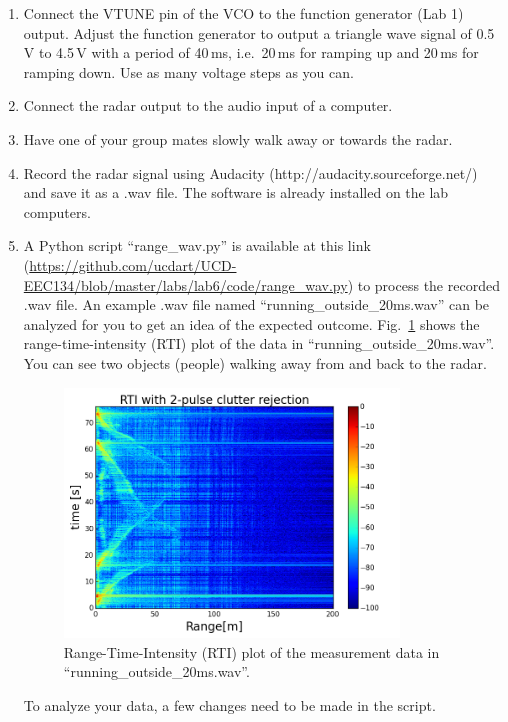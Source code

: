 \documentclass[letterpaper, 11pt]{article}
\begin{document}
\begin{enumerate}
	\item Connect the VTUNE pin of the VCO to the  function generator (Lab 1) output. Adjust the  function generator to output a triangle wave signal of 0.5\,V to 4.5\,V with a period of 40\,ms, i.e.~20\,ms for ramping up and 20\,ms for ramping down. Use as many voltage steps as you can. 
	
	\item Connect the radar output to the audio input of a computer. 
	
	\item Have one of your group mates slowly walk away or towards the radar. 
	
	\item Record the radar signal using Audacity (http://audacity.sourceforge.net/) and save it as a .wav file. The software is already installed on the lab computers.
	
	\item A Python script ``range\_wav.py'' is available at this link (\url{https://github.com/ucdart/UCD-EEC134/blob/master/labs/lab6/code/range_wav.py}) to process the recorded .wav file. An example .wav file named ``running\_outside\_20ms.wav'' can be analyzed for you to get an idea of the expected outcome. Fig.~\ref{fig:rti-cr} shows the range-time-intensity (RTI) plot of the data in ``running\_outside\_20ms.wav''. You can see two objects (people) walking away from and back to the radar. 
	
	\begin{figure}[h]
		\centering
		\includegraphics[width=3.5in]{rti-cr.png}
		\caption{Range-Time-Intensity (RTI) plot of the measurement data in ``running\_outside\_20ms.wav''.}
		\label{fig:rti-cr}
	\end{figure} 	
	
	
	To analyze your data, a few changes need to be made in the script.
	

\end{enumerate}
\end{document}
